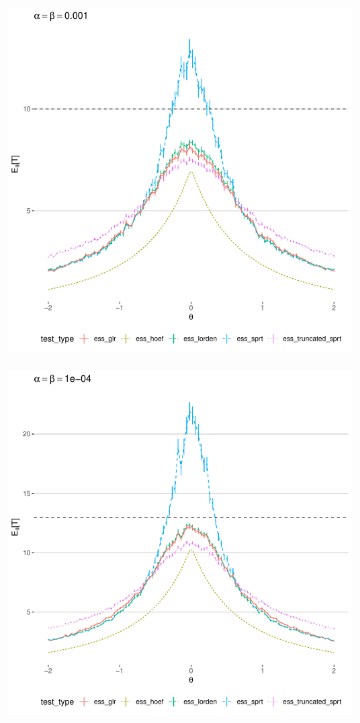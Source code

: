 \documentclass[11pt]{article}
\begin{document}
\begin{figure}[hp]
\begin{subfigure}{0.49\textwidth}
\end{subfigure}
\begin{subfigure}{0.49\textwidth}
    \includegraphics[width=\textwidth]{images/ess_alpha1e3}
\end{subfigure}
\hfill
\begin{subfigure}{0.49\textwidth}
    \includegraphics[width=\textwidth]{images/ess_alpha1e4}
\end{subfigure}


\end{figure}
\end{document}
